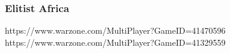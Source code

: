 \subsubsection{Elitist Africa}

https://www.warzone.com/MultiPlayer?GameID=41470596
https://www.warzone.com/MultiPlayer?GameID=41329559